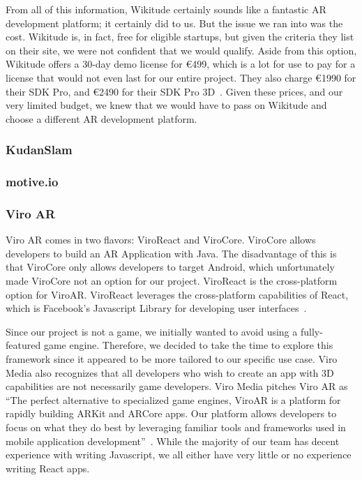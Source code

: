 \documentclass[a4paper, 10pt, american, titlepage]{article}
\begin{document}
From all of this information, Wikitude certainly sounds like a fantastic AR development
platform; it certainly did to us. But the issue we ran into was the cost. Wikitude is, in
fact, free for eligible startups, but given the criteria they list on their site, we were not
confident that we would qualify. Aside from this option, Wikitude offers a 30-day demo
license for \euro{499}, which is a lot for use to pay for a license that would not even last for
our entire project. They also charge \euro{1990} for their SDK Pro, and \euro{2490} for their
SDK Pro 3D~\autocite{wikitude2018}. Given these prices, and our very limited budget,
we knew that we would have to pass on Wikitude and choose a different AR
development platform. 

\subsubsection{KudanSlam}
\label{sec:kudanSlam}

\subsubsection{motive.io}
\label{sec:motive.io}

\subsubsection{Viro AR}
\label{sec:viroAR}

Viro AR comes in two flavors: ViroReact and ViroCore. ViroCore allows
developers to build an AR Application with Java. The disadvantage of this is
that ViroCore only allows developers to target Android, which unfortunately
made ViroCore not an option for our project. ViroReact is the cross-platform
option for ViroAR. ViroReact leverages the cross-platform capabilities of
React, which is Facebook's Javascript Library for developing user
interfaces~\autocite{facebook2019}.

Since our project is not a game, we initially wanted to avoid using a
fully-featured game engine. Therefore, we decided to take the time to explore
this framework since it appeared to be more tailored to our specific use case.
Viro Media also recognizes that all developers who wish to create an app with
3D capabilities are not necessarily game developers. Viro Media pitches Viro
AR as ``The perfect alternative to specialized game engines, ViroAR is a
platform for rapidly building ARKit and ARCore apps. Our platform allows
developers to focus on what they do best by leveraging familiar tools and
frameworks used in mobile application development''~\autocite{viro2019}.
While the majority of our team has decent experience with writing Javascript,
we all either have very little or no experience writing React apps.
\end{document}
